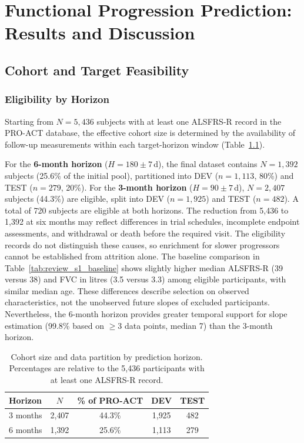 \chapter{Functional Progression Prediction: Results and Discussion}
\label{ch:study1_results}

\section{Cohort and Target Feasibility}
\label{sec:results_cohort}

\subsection{Eligibility by Horizon}
\label{subsec:results_eligibility}
Starting from $N\!=\!5{,}436$ subjects with at least one ALSFRS-R record in the PRO-ACT database, the effective cohort size is determined by the availability of follow-up measurements within each target-horizon window (Table~\ref{tab:eligibility}).

For the \textbf{6-month horizon} ($H\!=\!180 \pm 7$\,d), the final dataset contains $N\!=\!1{,}392$ subjects (25.6\% of the initial pool), partitioned into DEV ($n\!=\!1{,}113$, 80\%) and TEST ($n\!=\!279$, 20\%).
For the \textbf{3-month horizon} ($H\!=\!90 \pm 7$\,d), $N\!=\!2{,}407$ subjects (44.3\%) are eligible, split into DEV ($n\!=\!1{,}925$) and TEST ($n\!=\!482$).
A total of 720 subjects are eligible at both horizons.
The reduction from 5{,}436 to 1{,}392 at six months may reflect differences in trial schedules, incomplete endpoint assessments, and withdrawal or death before the required visit. The eligibility records do not distinguish these causes, so enrichment for slower progressors cannot be established from attrition alone. The baseline comparison in Table~\ref{tab:review_s1_baseline} shows slightly higher median ALSFRS-R (39 versus 38) and FVC in litres (3.5 versus 3.3) among eligible participants, with similar median age. These differences describe selection on observed characteristics, not the unobserved future slopes of excluded participants.
Nevertheless, the 6-month horizon provides greater temporal support for slope estimation (99.8\% based on $\geq 3$ data points, median 7) than the 3-month horizon.

\begin{table}[ht!]
\centering
\caption[Cohort size by prediction horizon]{Cohort size and data partition by prediction horizon. Percentages are relative to the 5,436 participants with at least one ALSFRS-R record.}
\label{tab:eligibility}
\small
\begin{tabular}{lcccc}
\toprule
Horizon & $N$ & \% of PRO-ACT & DEV & TEST \\
\midrule
3 months & 2{,}407 & 44.3\% & 1{,}925 & 482 \\
6 months & 1{,}392 & 25.6\% & 1{,}113 & 279 \\
\bottomrule
\end{tabular}
\end{table}

